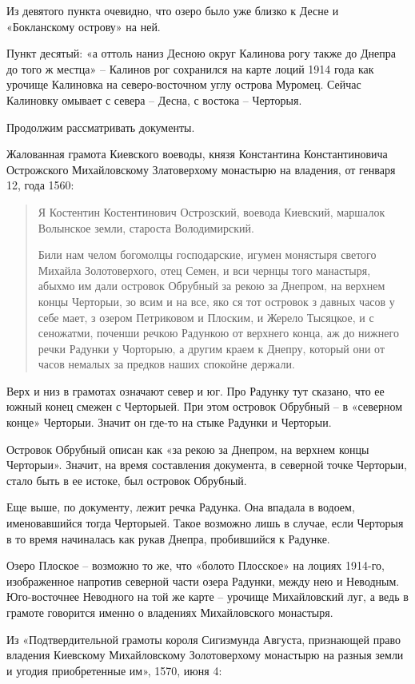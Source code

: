 Из девятого пункта очевидно, что озеро было уже близко к Десне и «Бокланскому острову» на ней.

Пункт десятый: «а оттоль наниз Десною округ Калинова рогу также до Днепра до того ж местца» – Калинов рог сохранился на карте лоций 1914 года как урочище Калиновка на северо-восточном углу острова Муромец. Сейчас Калиновку омывает с севера – Десна, с востока – Черторыя.

Продолжим рассматривать документы.

Жалованная грамота Киевского воеводы, князя Константина Константиновича Острожского Михайловскому Златоверхому монастырю на владения, от генваря 12, года 1560:

\begin{quotation}
Я Костентин Костентинович Острозский, воевода Киевский, маршалок Волынское земли, староста Володимирский. 

Били нам челом богомолцы господарские, игумен монястыря светого Михайла Золотоверхого, отец Семен, и вси чернцы того манастыря, абыхмо им дали островок Обрубный за рекою за Днепром, на верхнем концы Черторыи, зо всим и на все, яко ся тот островок з давных часов у себе мает, з озером Петриковом и Плоским, и Жерело Тысяцкое, и с сеножатми, поченши речкою Радункою от верхнего конца, аж до нижнего речки Радунки у Чорторыю, а другим краем к Днепру, который они от часов немалых за предков наших спокойне держали.
\end{quotation}

Верх и низ в грамотах означают север и юг. Про Радунку тут сказано, что ее южный конец смежен с Черторыей. При этом островок Обрубный – в «северном конце» Черторыи. Значит он где-то на стыке Радунки и Черторыи.

Островок Обрубный описан как «за рекою за Днепром, на верхнем концы Черторыи». Значит, на время составления документа, в северной точке Черторыи, стало быть в ее истоке, был островок Обрубный.

Еще выше, по документу, лежит речка Радунка. Она впадала в водоем, именовавшийся тогда Черторыей. Такое возможно лишь в случае, если Черторыя в то время начиналась как рукав Днепра, пробившийся к Радунке.

Озеро Плоское – возможно то же, что «болото Плосское» на лоциях 1914-го, изображенное напротив северной части озера Радунки, между нею и Неводным. Юго-восточнее Неводного на той же карте – урочище Михайловский луг, а ведь в грамоте говорится именно о владениях Михайловского монастыря.

Из «Подтвердительной грамоты короля Сигизмунда Августа, признающей право владения Киевскому Михайловскому Золотоверхому монастырю на разныя земли и угодия приобретенные им», 1570, июня 4:

